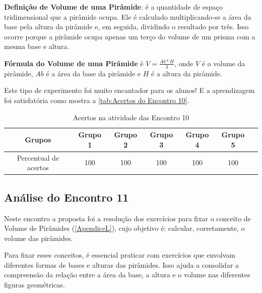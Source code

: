 \textbf{Definição de Volume de uma Pirâmide}: é a quantidade de espaço tridimensional que a pirâmide ocupa. Ele é calculado multiplicando-se a área da base pela altura da pirâmide e, em seguida, dividindo o resultado por três. Isso ocorre porque a pirâmide ocupa apenas um terço do volume de um prisma com a mesma base e altura.

\textbf{Fórmula do Volume de uma Pirâmide} é \textcolor[HTML]{0000FF}{$V = \frac{Ab *H}{3}$}, onde $V$ é o volume da pirâmide, $Ab$ é a área da base da pirâmide e $H$ é a altura da pirâmide.

Este tipo de experimento foi muito encantador para os alunos! E a aprendizagem foi satisfatória como mostra a \autoref{tab:Acertos do Encontro 10}.

\begin{table}[htbp] \centering
    \caption{Acertos na atividade das Encontro 10} \label{tab:Acertos do Encontro 10}
    \begin{tabular}{|c|c|c|c|c|c|c|}
        \hline
        \textbf{Grupos}       & \textbf{Grupo 1} & \textbf{Grupo 2} & \textbf{Grupo 3} & \textbf{Grupo 4} & \textbf{Grupo 5} \\
        \hline
        Percentual de acertos & 100              & 100              & 100              & 100              & 100              \\
        \hline
    \end{tabular}
    \legend{\legendaTabela}
\end{table}

\subsection{Análise do Encontro 11}

Neste encontro a proposta foi a resolução dos exercícios para fixar o conceito de Volume de Pirâmides (\autoref{ApendiceL}), cujo objetivo é: calcular, corretamente, o volume das pirâmides.

Para fixar esses conceitos, é essencial praticar com exercícios que envolvam diferentes formas de bases e alturas das pirâmides. Isso ajuda a consolidar a compreensão da relação entre a área da base, a altura e o volume nas diferentes figuras geométricas.



